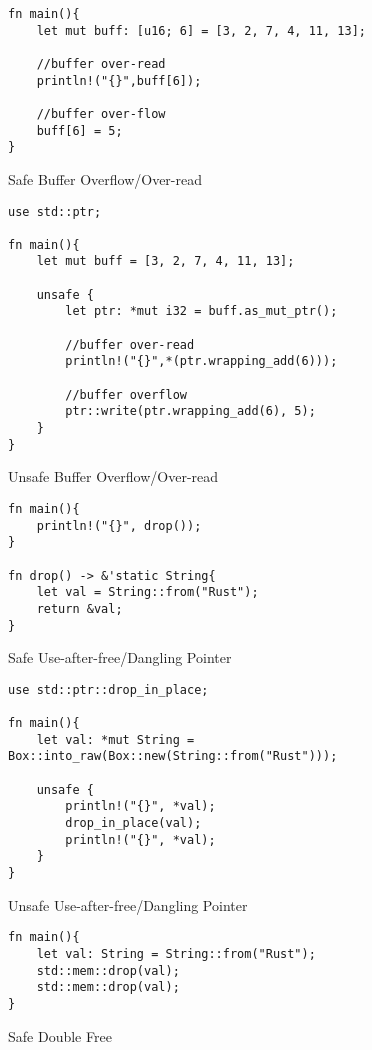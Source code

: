 \documentclass[sigconf,authorversion,nonacm]{acmart}
\begin{document}
\begin{figure} [H] 
\caption{Safe Buffer Overflow/Over-read}
    \begin{lstlisting}
fn main(){
    let mut buff: [u16; 6] = [3, 2, 7, 4, 11, 13];

    //buffer over-read
    println!("{}",buff[6]);

    //buffer over-flow
    buff[6] = 5;
}
    \end{lstlisting}
\end{figure}

\begin{figure} [H] 
\caption{Unsafe Buffer Overflow/Over-read}
    \begin{lstlisting}
use std::ptr;

fn main(){
    let mut buff = [3, 2, 7, 4, 11, 13];

    unsafe {
        let ptr: *mut i32 = buff.as_mut_ptr();

        //buffer over-read
        println!("{}",*(ptr.wrapping_add(6)));

        //buffer overflow
        ptr::write(ptr.wrapping_add(6), 5);
    }
}
    \end{lstlisting}
\end{figure}

\begin{figure} [H] 
\caption{Safe Use-after-free/Dangling Pointer}
    \begin{lstlisting}
fn main(){
    println!("{}", drop());
}

fn drop() -> &'static String{
    let val = String::from("Rust");
    return &val;
}
    \end{lstlisting}
\end{figure}

\begin{figure} [H] 
\caption{Unsafe Use-after-free/Dangling Pointer}
    \begin{lstlisting}
use std::ptr::drop_in_place;

fn main(){
    let val: *mut String = Box::into_raw(Box::new(String::from("Rust")));

    unsafe {
        println!("{}", *val);
        drop_in_place(val);
        println!("{}", *val);
    }
}
    \end{lstlisting}
\end{figure}

\begin{figure} [H] 
\caption{Safe Double Free}
    \begin{lstlisting}
fn main(){
    let val: String = String::from("Rust");
    std::mem::drop(val);
    std::mem::drop(val);
}
    \end{lstlisting}
\end{figure}
\end{document}
